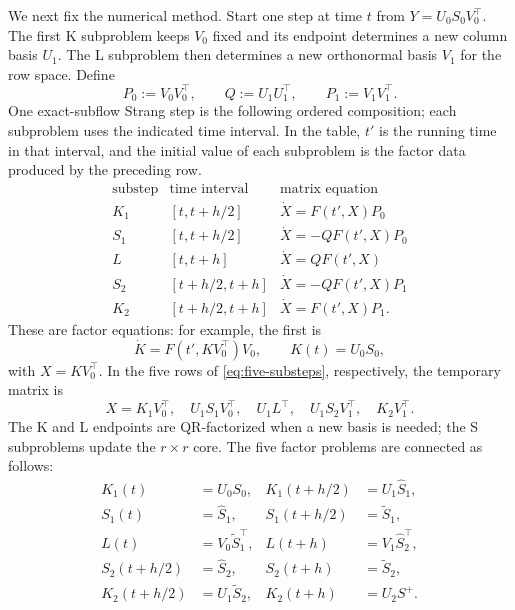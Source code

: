 \documentclass[]{article}
\numberwithin{equation}{section}
\theoremstyle{plain}
\theoremstyle{remark}
\begin{document}
We next fix the numerical method.  Start one step at time $t$ from
$Y=U_0S_0V_0^\top$.  The first K subproblem keeps $V_0$ fixed and
its endpoint determines a new column basis $U_1$.  The L subproblem
then determines a new orthonormal basis $V_1$ for the row space.  Define
\begin{equation}\label{eq:projectors-one-step}
 P_0:=V_0V_0^\top,\qquad Q:=U_1U_1^\top,
 \qquad P_1:=V_1V_1^\top.
\end{equation}
One exact-subflow Strang step is the following ordered composition; each
subproblem uses the indicated time interval.  In the table, \(t'\)
is the running time in that interval, and the initial value of each
subproblem is the factor data produced by the preceding row.
\begin{equation}\label{eq:five-substeps}
\begin{array}{c|c|c}
\text{substep}&\text{time interval}&\text{matrix equation}\\
\hline
K_1&[t,t+h/2]&\dot X=F(t',X)P_0\\
S_1&[t,t+h/2]&\dot X=-QF(t',X)P_0\\
L  &[t,t+h]  &\dot X=QF(t',X)\\
S_2&[t+h/2,t+h]&\dot X=-QF(t',X)P_1\\
K_2&[t+h/2,t+h]&\dot X=F(t',X)P_1.
\end{array}
\end{equation}
These are factor equations: for example, the first is
\[
 \dot K=F(t',KV_0^\top)V_0,\qquad K(t)=U_0S_0,
\]
with $X=KV_0^\top$.  In the five rows of
\eqref{eq:five-substeps}, respectively, the temporary matrix is
\begin{equation}\label{eq:five-factor-representations}
 X=K_1V_0^\top,\quad U_1S_1V_0^\top,\quad U_1L^\top,
 \quad U_1S_2V_1^\top,\quad K_2V_1^\top.
\end{equation}
The K and L endpoints are QR-factorized when a
new basis is needed; the S subproblems update the $r\times r$ core.
The five factor problems are connected as follows:
\begin{equation}\label{eq:factor-transfers}
\begin{aligned}
 K_1(t)&=U_0S_0,
 &K_1(t+h/2)&=U_1\widehat S_1,\\
 S_1(t)&=\widehat S_1,
 &S_1(t+h/2)&=\widetilde S_1,\\
 L(t)&=V_0\widetilde S_1^\top,
 &L(t+h)&=V_1\widehat S_2^\top,\\
 S_2(t+h/2)&=\widehat S_2,
 &S_2(t+h)&=\widetilde S_2,\\
 K_2(t+h/2)&=U_1\widetilde S_2,
 &K_2(t+h)&=U_2S^+.
\end{aligned}
\end{equation}
\end{document}
